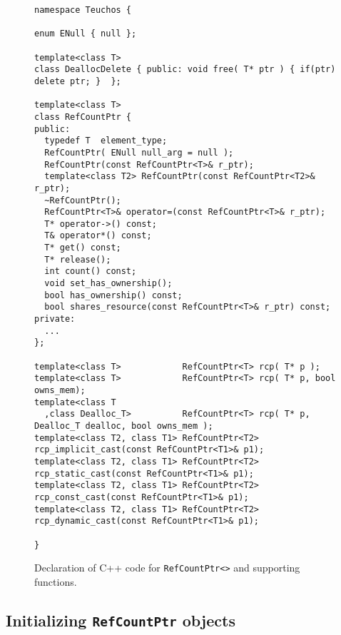 \begin{figure}
{\scriptsize\begin{verbatim}
namespace Teuchos {

enum ENull { null };

template<class T>
class DeallocDelete { public: void free( T* ptr ) { if(ptr) delete ptr; }  };

template<class T>
class RefCountPtr {
public:
  typedef T  element_type;
  RefCountPtr( ENull null_arg = null );
  RefCountPtr(const RefCountPtr<T>& r_ptr);
  template<class T2> RefCountPtr(const RefCountPtr<T2>& r_ptr);
  ~RefCountPtr();
  RefCountPtr<T>& operator=(const RefCountPtr<T>& r_ptr);
  T* operator->() const;
  T& operator*() const;
  T* get() const;
  T* release();
  int count() const;
  void set_has_ownership();
  bool has_ownership() const;
  bool shares_resource(const RefCountPtr<T>& r_ptr) const;
private:
  ...
};

template<class T>            RefCountPtr<T> rcp( T* p );
template<class T>            RefCountPtr<T> rcp( T* p, bool owns_mem);
template<class T
  ,class Dealloc_T>          RefCountPtr<T> rcp( T* p, Dealloc_T dealloc, bool owns_mem );
template<class T2, class T1> RefCountPtr<T2> rcp_implicit_cast(const RefCountPtr<T1>& p1);
template<class T2, class T1> RefCountPtr<T2> rcp_static_cast(const RefCountPtr<T1>& p1);
template<class T2, class T1> RefCountPtr<T2> rcp_const_cast(const RefCountPtr<T1>& p1);
template<class T2, class T1> RefCountPtr<T2> rcp_dynamic_cast(const RefCountPtr<T1>& p1);

}
\end{verbatim}}
\caption{\label{rcp:fig:decl}
Declaration of C++ code for \texttt{RefCountPtr<>} and supporting functions.}
\end{figure}

%
\subsection{Initializing \texttt{RefCountPtr} objects}
%

